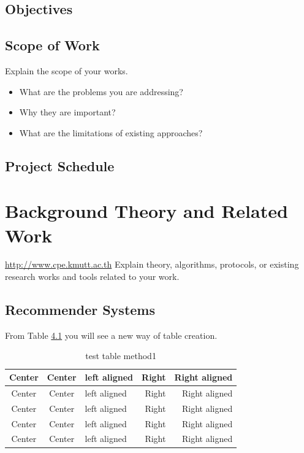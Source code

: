 \documentclass[12pt,oneside,openright,a4paper]{explo-english-project}
\begin{document}
\section{Objectives}

\section{Scope of Work}

Explain the scope of your works. 
\begin{itemize}
\item   What are the problems you are addressing? 
\item  Why they are important?
\item  What are the limitations of existing approaches? 
\end{itemize}

\section{Project Schedule}


\chapter{Background Theory and Related Work}

\url{http://www.cpe.kmutt.ac.th}
Explain theory, algorithms, protocols, or existing research works and tools related to your work. \cite{santi05b} \cite{bworld,hypersense}

\section{Recommender Systems}
From Table \ref{tbl:method1} you will see a new way of table creation.

\begin{table}[!h]
\caption{test table method1}\label{tbl:method1}
\begin{tabular}{c|c|l|rr} \hline\hline
Center & Center & left aligned & Right & Right aligned \\ \hline\hline
Center & Center & left aligned & Right & Right aligned \\ \hline
Center & Center & left aligned & Right & Right aligned \\ 
Center & Center & left aligned & Right & Right aligned \\ \hline
Center & Center & left aligned & Right & Right aligned \\ \hline\hline
\end{tabular}
\end{table}
\end{document}
